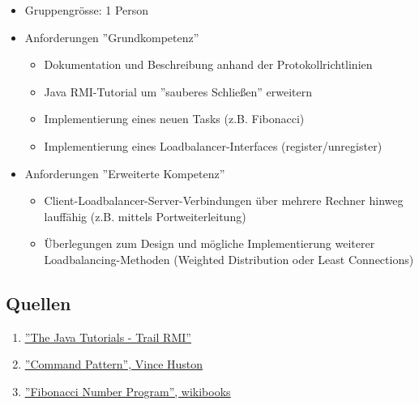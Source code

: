 \begin{itemize}
	\item Gruppengrösse: 1 Person
	\item Anforderungen ''Grundkompetenz''
		\begin{itemize}
			\item Dokumentation und Beschreibung anhand der Protokollrichtlinien
		\end{itemize}

		\begin{itemize}
			\item Java RMI-Tutorial um ''sauberes Schließen'' erweitern
		\end{itemize}

		\begin{itemize}
			\item Implementierung eines neuen Tasks (z.B. Fibonacci)
		\end{itemize}

		\begin{itemize}
			\item Implementierung eines Loadbalancer-Interfaces (register/unregister)
		\end{itemize}
	\item Anforderungen ''Erweiterte Kompetenz''
		\begin{itemize}
			\item Client-Loadbalancer-Server-Verbindungen über mehrere Rechner hinweg lauffähig (z.B. mittels Portweiterleitung)
		\end{itemize}

		\begin{itemize}
			\item Überlegungen zum Design und mögliche Implementierung weiterer Loadbalancing-Methoden (Weighted Distribution oder Least Connections)
		\end{itemize}
\end{itemize}

\subsection{Quellen}

\begin{enumerate}
	\item \href{http://docs.oracle.com/javase/tutorial/rmi/}{\color{blue}\underline{''The Java Tutorials - Trail RMI''}}
	\item \href{http://vincehuston.org/dp/command.html}{\color{blue}\underline{''Command Pattern'', Vince Huston}}
	\item \href{https://en.wikibooks.org/wiki/Algorithm_Implementation/Mathematics/Fibonacci_Number_Program}{\color{blue}\underline{''Fibonacci Number Program'', wikibooks}}
\end{enumerate}

\clearpage

